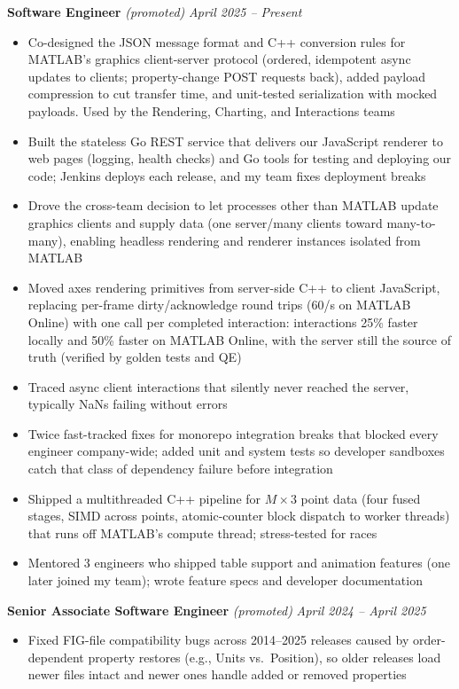 \documentclass{article}
\begin{document}
{\large \textbf{Software Engineer}} \textit{(promoted)} \hfill \textit{April 2025 -- Present}
\begin{itemize}[leftmargin=*]
    \item Co-designed the JSON message format and C++ conversion rules for MATLAB's graphics client-server protocol (ordered, idempotent async updates to clients; property-change POST requests back), added payload compression to cut transfer time, and unit-tested serialization with mocked payloads. Used by the Rendering, Charting, and Interactions teams
    \item Built the stateless Go REST service that delivers our JavaScript renderer to web pages (logging, health checks) and Go tools for testing and deploying our code; Jenkins deploys each release, and my team fixes deployment breaks
    \item Drove the cross-team decision to let processes other than MATLAB update graphics clients and supply data (one server\slash many clients toward many-to-many), enabling headless rendering and renderer instances isolated from MATLAB
    \item Moved axes rendering primitives from server-side C++ to client JavaScript, replacing per-frame dirty/acknowledge round trips (60/s on MATLAB Online) with one call per completed interaction: interactions 25\% faster locally and 50\% faster on MATLAB Online, with the server still the source of truth (verified by golden tests and QE)
    \item Traced async client interactions that silently never reached the server, typically NaNs failing without errors
    \item Twice fast-tracked fixes for monorepo integration breaks that blocked every engineer company-wide; added unit and system tests so developer sandboxes catch that class of dependency failure before integration
    \item Shipped a multithreaded C++ pipeline for $M \times 3$ point data (four fused stages, SIMD across points, atomic-counter block dispatch to worker threads) that runs off MATLAB's compute thread; stress-tested for races
    \item Mentored 3 engineers who shipped table support and animation features (one later joined my team); wrote feature specs and developer documentation
\end{itemize}

{\large \textbf{Senior Associate Software Engineer}} \textit{(promoted)} \hfill \textit{April 2024 -- April 2025}
\begin{itemize}[leftmargin=*]
    \item Fixed FIG-file compatibility bugs across 2014--2025 releases caused by order-dependent property restores (e.g., Units vs.\ Position), so older releases load newer files intact and newer ones handle added or removed properties
\end{itemize}
\end{document}

